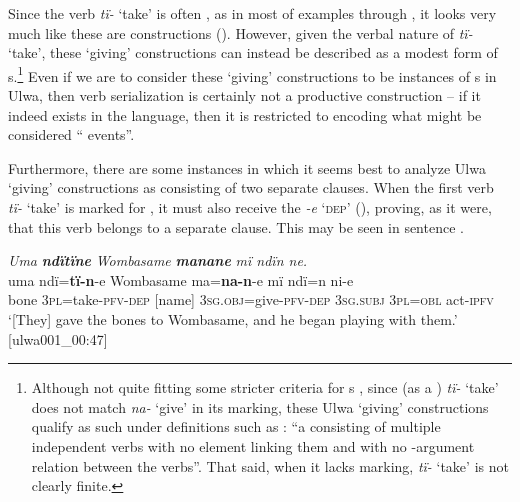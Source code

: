 Since the verb \textit{tï-} ‘take’ is often , as in most of examples  through , it looks very much like these are  constructions (). However, given the verbal nature of \textit{tï-} ‘take’, these ‘giving’ constructions can instead be described as a modest form of s.\footnote{Although not quite fitting some stricter criteria for s \citep[8]{Aikhenvald2006}, since (as a ) \textit{tï-} ‘take’ does not match \textit{na-} ‘give’ in its  marking, these Ulwa ‘giving’ constructions qualify as such under definitions such as : “a  consisting of multiple independent verbs with no element linking them and with no -argument relation between the verbs”. That said, when it lacks  marking, \textit{tï-} ‘take’ is not clearly finite.} Even if we are to consider these ‘giving’ constructions to be instances of s in Ulwa, then verb serialization is certainly not a productive  construction -- if it indeed exists in the language, then it is restricted to encoding what might be considered “ events”.

  Furthermore, there are some instances in which it seems best to analyze Ulwa ‘giving’ constructions as consisting of two separate clauses. When the first verb \textit{tï-} ‘take’ is marked for , it must also receive the  \textit{-e} ‘\textsc{dep}’ (), proving, as it were, that this verb belongs to a separate clause. This may be seen in sentence .

\ea%
    \label{ex:clause:41}
          \textit{Uma} \textbf{\textit{ndïtïne}} \textit{Wombasame} \textbf{\textit{manane}} \textit{mï ndïn ne.}\\
\gll    uma  ndï=\textbf{tï-n}{}-e      Wombasame  ma=\textbf{na-n}{}-e mï      ndï=n    ni{}-e\\
    bone  3\textsc{pl}=take-\textsc{pfv-dep}  [name]      \textsc{3sg.obj}=give-\textsc{pfv-dep}    3\textsc{sg.subj}  3\textsc{pl=obl}  act-\textsc{ipfv}\\
\glt `[They] gave the bones to Wombasame, and he began playing with them.’ [ulwa001\_00:47]
\z


